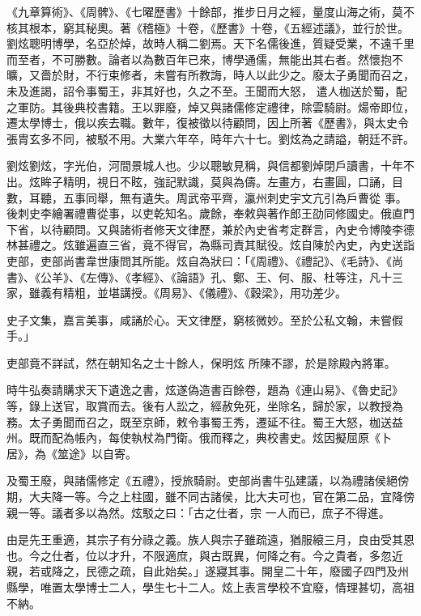 \begin{pinyinscope}
 《九章算術》、《周髀》、《七曜歷書》十餘部，推步日月之經，量度山海之術，莫不核其根本，窮其秘奧。著《稽極》十卷，《歷書》十卷，《五經述議》，並行於世。劉炫聰明博學，名亞於焯，故時人稱二劉焉。天下名儒後進，質疑受業，不遠千里而至者，不可勝數。論者以為數百年已來，博學通儒，無能出其右者。然懷抱不曠，又嗇於財，不行束修者，未嘗有所教誨，時人以此少之。廢太子勇聞而召之，未及進謁，詔令事蜀王，非其好也，久之不至。王聞而大怒，
 遣人枷送於蜀，配之軍防。其後典校書籍。王以罪廢，焯又與諸儒修定禮律，除雲騎尉。煬帝即位，遷太學博士，俄以疾去職。數年，復被徵以待顧問，因上所著《歷書》，與太史令張胄玄多不同，被駁不用。大業六年卒，時年六十七。劉炫為之請謚，朝廷不許。



 劉炫劉炫，字光伯，河間景城人也。少以聰敏見稱，與信都劉焯閉戶讀書，十年不出。炫眸子精明，視日不眩，強記默識，莫與為儔。左畫方，右畫圓，口誦，目數，耳聽，五事同舉，無有遺失。周武帝平齊，瀛州刺史宇文亢引為戶曹從
 事。後刺史李繪署禮曹從事，以吏乾知名。歲餘，奉敕與著作郎王劭同修國史。俄直門下省，以待顧問。又與諸術者修天文律歷，兼於內史省考定群言，內史令博陵李德林甚禮之。炫雖遍直三省，竟不得官，為縣司責其賦役。炫自陳於內史，內史送詣吏部，吏部尚書韋世康問其所能。炫自為狀曰：「《周禮》、《禮記》、《毛詩》、《尚書》、《公羊》、《左傳》、《孝經》、《論語》孔、鄭、王、何、服、杜等注，凡十三家，雖義有精粗，並堪講授。《周易》、《儀禮》、《穀梁》，用功差少。



 史子文集，嘉言美事，咸誦於心。天文律歷，窮核微妙。至於公私文翰，未嘗假手。」



 吏部竟不詳試，然在朝知名之士十餘人，保明炫
 所陳不謬，於是除殿內將軍。



 時牛弘奏請購求天下遺逸之書，炫遂偽造書百餘卷，題為《連山易》、《魯史記》等，錄上送官，取賞而去。後有人訟之，經赦免死，坐除名，歸於家，以教授為務。太子勇聞而召之，既至京師，敕令事蜀王秀，遷延不往。蜀王大怒，枷送益州。既而配為帳內，每使執杖為門衛。俄而釋之，典校書史。炫因擬屈原《卜居》，為《筮途》以自寄。



 及蜀王廢，與諸儒修定《五禮》，授旅騎尉。吏部尚書牛弘建議，以為禮諸侯絕傍期，大夫降一等。今之上柱國，雖不同古諸侯，比大夫可也，官在第二品，宜降傍親一等。議者多以為然。炫駁之曰：「古之仕者，宗
 一人而已，庶子不得進。



 由是先王重適，其宗子有分祿之義。族人與宗子雖疏遠，猶服縗三月，良由受其恩也。今之仕者，位以才升，不限適庶，與古既異，何降之有。今之貴者，多忽近親，若或降之，民德之疏，自此始矣。」遂寢其事。開皇二十年，廢國子四門及州縣學，唯置太學博士二人，學生七十二人。炫上表言學校不宜廢，情理甚切，高祖不納。




\end{pinyinscope}
